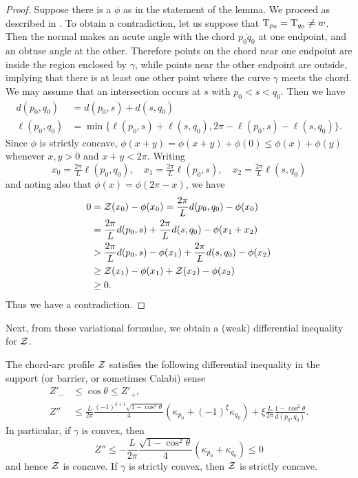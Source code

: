 \documentclass[a4paper, 12pt]{amsart}
\begin{document}
\begin{proof}
Suppose there is a $\phi$ as in the statement of the lemma. We proceed as described in \cite{MR2794630}. To obtain a contradiction, let us suppose that $\operatorname{T}_{p_0} = \operatorname{T}_{q_0} \ne w$. Then the normal makes an acute angle with the chord $\overline{p_0 q_0}$ at one endpoint, and an obtuse angle at the other. Therefore points on the chord near one endpoint are inside the region enclosed by $\gamma$, while points near the other endpoint are outside, implying that there is at least one other point where the curve $\gamma$ meets the chord. We may assume that an intersection occurs at $s$ with $p_0 < s < q_0$. Then we have
\begin{align*}
d(p_0, q_0) &= d(p_0, s) + d(s, q_0) \\
\ell(p_0, q_0) &= \min\{\ell(p_0, s) + \ell(s, q_0),  2\pi -\ell(p_0,s ) - \ell(s, q_0)\}.
\end{align*}
Since $\phi$ is strictly concave, $\phi(x + y) = \phi(x + y) + \phi(0) \leq \phi(x) + \phi(y)$ whenever $x, y > 0$ and $x + y < 2\pi$. Writing
\[
x_0 = \tfrac{2\pi}{L}\ell(p_0, q_0), \quad x_1 = \tfrac{2\pi}{L}\ell(p_0, s), \quad x_2 = \tfrac{2\pi}{L}\ell(s, q_0)
\]
and noting also that $\phi(x) = \phi(2\pi - x)$, we have
\[
\begin{split}
0 &= \operatorname{\mathcal{Z}}(x_0) - \phi(x_0) =  \frac{2\pi}{L} d(p_0, q_0) - \phi(x_0) \\
&= \frac{2\pi}{L}d(p_0, s) + \frac{2\pi}{L} d(s, q_0) - \phi(x_1 + x_2) \\
&> \frac{2\pi}{L} d(p_0, s) - \phi(x_1) + \frac{2\pi}{L}d(s, q_0) - \phi(x_2) \\
&\geq \operatorname{\mathcal{Z}}(x_1) - \phi(x_1) + \operatorname{\mathcal{Z}}(x_2) - \phi(x_2) \\
&\geq 0.
\end{split}
\]
Thus we have a contradiction. 
\end{proof}

Next, from these variational formulae, we obtain a (weak) differential inequality for $\operatorname{\mathcal{Z}}$.

\begin{thm}
\label{thm:barrier}
The chord-arc profile $\operatorname{\mathcal{Z}}$ satisfies the following differential inequality in the support (or barrier, or sometimes Calabi) sense
\begin{align*}
Z'_- &\leq \cos\theta \leq Z'_+, \\
Z'' &\leq \frac{L}{2\pi}\frac{(-1)^{\delta+1}\sqrt{1-\cos^2\theta}}{4} (\kappa_{p_0} + (-1)^{\xi}\kappa_{q_0}) + \xi \frac{L}{2\pi} \frac{1-\cos^2\theta}{d(p_0,q_0)}.
\end{align*}
In particular, if $\gamma$ is convex, then
\[
Z'' \leq - \frac{L}{2\pi} \frac{\sqrt{1-\cos^2 \theta}}{4} (\kappa_{p_0} + \kappa_{q_0}) \leq 0
\]
and hence $\operatorname{\mathcal{Z}}$ is concave. If $\gamma$ is strictly convex, then $\operatorname{\mathcal{Z}}$ is strictly concave.
\end{thm}
\end{document}
